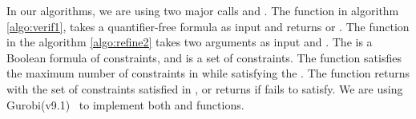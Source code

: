 
In our algorithms, we are using two major calls \checksat{} and \maxsat{}.
The function \checksat{} in algorithm \ref{algo:verif1}, 
takes a quantifier-free formula as input and returns \sat{} or \unsat{}. 
The function \maxsat{} in the algorithm \ref{algo:refine2} takes
two arguments as input \hardconstr{} and \softconstr{}. 
The \hardconstr{} is a Boolean formula of constraints,
and \softconstr{} is a set of constraints. 
The function \maxsat{} satisfies the maximum number of constraints
in \softconstr{} while satisfying the \hardconstr{}. 
The function \maxsat{} returns \sat{} with the set of
constraints satisfied in \softconstr{}, or returns
\unsat{} if \hardconstr{} fails to satisfy.
We are using Gurobi(v9.1)~\cite{gurobioptimizer} to implement 
both \checksat{} and \maxsat{} functions. 





